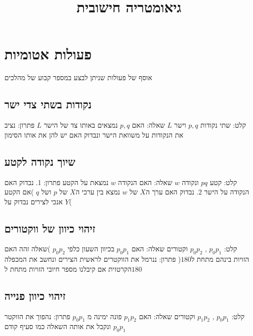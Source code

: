 \documentclass{article}
\title{ גיאומטריה חישובית }
\makeatletter
\newcommand*{\saved@uline}{}
\let\saved@uline\uline
\newcommand*{\mathuline}{%
  \mathpalette{\math@uline\saved@uline}%
}
\newcommand*{\math@uline}[3]{%
  \mbox{#1{$#2#3\m@th$}}%
}
\renewcommand*{\uline}{%
  \relax  
  \ifmmode
    \expandafter\mathuline
  \else
    \expandafter\saved@uline
  \fi
}
\makeatother
\begin{document}
\maketitle


\section{ פעולות אטומיות}
אוסף של פעולות שניתן לבצע במספר קבוע של מהלכים

\subsection{נקודות בשתי צדי ישר}
\noindent \uline{קלט:} שתי נקודות $p,q$ וישר $L$
\newline \uline{ שאלה:} האם $p,q$ נמצאים באותו צד של הישר $L$
\newline \uline{פתרון:} נציב את הנקודות על משוואת הישר ונבדוק האם יש להן את אותו הסימון

\subsection{שיוך נקודה לקטע}
\noindent \uline{קלט:} קטע $pq$ ונקודה $w$
\newline \uline{ שאלה:} האם הנקודה $w$ נמצאת על הקטע
\newline \uline{פתרון:} 1. נבדוק האם הנקודה על הישר 2. נבדוק האם ערך ה$X$ של $w$ נמצא בין ערכי ה$X$ של $p$ ושל $q$ )אם הקטע אנכי לצירים נבדוק על $Y$(

\subsection{זיהוי כיוון של ווקטורים}
\noindent \uline{קלט:} $p_0p_1$ , $p_0p_2$ וקטורים
\newline \uline{שאלה:} האם $p_0p_1$ בכיוון השעון כלפי $p_0p_2$ )שאלה זהה האם הזויות בינהם מתחת ל$180$(
\newline \uline{פתרון:} ננרמל את הווקטרים לראשית הצירים ונחשב את המכפלה הקרטזית אם קיבלנו מספר חיובי הזויות מתחת ל$180$

\subsection{זיהוי כיוון פנייה}
\noindent \uline{קלט:} $p_0p_1$ , $p_1p_2$ וקטורים
\newline \uline{שאלה:} האם $p_1p_2$ פונה ימינה מ $p_0p_1$
\newline \uline{פתרון:} נהפוך את הווקטר $p_0p_1$ ונקבל את אותה השאלה כמו סעיף קודם
\end{document}

